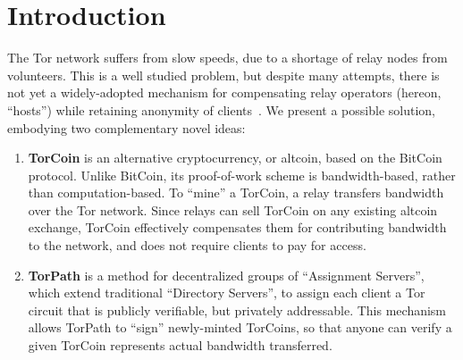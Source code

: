 \section{Introduction}

The Tor network suffers from slow speeds, due to a shortage of relay nodes
from volunteers. This is a well studied problem, but despite many attempts,
there is not yet a widely-adopted mechanism for compensating relay operators
(hereon, ``hosts'') while retaining anonymity of clients~\cite{raykova-
pet2008, wpes09-xpay, incentives-fc10, ccs10-braids, acsac11-tortoise,
jansen2013lira, johnson2013onions}. We present a possible solution, embodying
two complementary novel ideas:

\begin{enumerate}
\item \textbf{TorCoin} is an alternative cryptocurrency, or altcoin, based on the BitCoin protocol\cite{nakamoto2008bitcoin}. Unlike BitCoin, its proof-of-work scheme is bandwidth-based, rather than computation-based. To ``mine'' a TorCoin, a relay transfers bandwidth over the Tor network. Since relays can sell TorCoin on any existing altcoin exchange, TorCoin effectively compensates them for contributing bandwidth to the network, and does not require clients to pay for access.

\item \textbf{TorPath} is a method for decentralized groups of ``Assignment Servers'', which extend traditional ``Directory Servers'', to assign each client a Tor circuit that is publicly verifiable, but privately addressable. This mechanism allows TorPath to ``sign'' newly-minted TorCoins, so that anyone can verify a given TorCoin represents actual bandwidth transferred. 
\end{enumerate}
